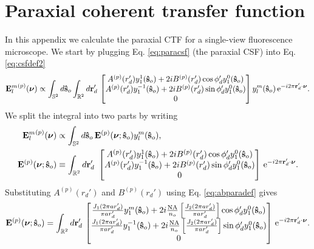 \documentclass[11pt]{article}
\newcommand{\me}{\mathrm{e}}
\providecommand{\mb}[1]{\mathbf{#1}}
\providecommand{\so}[1]{\mathbf{\hat{s}}_o}
\providecommand{\rd}[1]{\mathbf{r}_d}
\providecommand{\bs}[1]{\boldsymbol{#1}}
\begin{document}
\section{Paraxial coherent transfer function}\label{paraxialctf}
In this appendix we calculate the paraxial CTF for a single-view fluorescence
microscope. We start by plugging Eq. \ref{eq:paracsf} (the paraxial CSF) into Eq.
\ref{eq:csfdef2}
\begin{align}
  {\mb{E}_l^m}^{(p)}(\bs{\nu}) \propto \int_{\mathbb{S}^2}d\so{}\int_{\mathbb{R}^2}d\rd{}'\,
\begin{bmatrix}
    A^{(p)}(r_d')y_1^{1}(\so{}) + 2iB^{(p)}(r_d')\cos\phi_d'y_1^{0}(\so{})\\
    A^{(p)}(r_d')y_1^{-1}(\so{}) + 2iB^{(p)}(r_d')\sin\phi_d'y_1^{0}(\so{})\\
    0\\
  \end{bmatrix}
  y_l^m(\so{})\thinspace\me^{-i 2\pi\rd{}'\cdot\bs{\nu}}. 
\end{align}
We split the integral into two parts by writing
\begin{align}
  {\mb{E}_l^m}^{(p)}(\bs{\nu}) &\propto \int_{\mathbb{S}^2}d\so{}\, \mb{E}^{(p)}(\bs{\nu};\so{}) y_l^m(\so{}),\\ \label{eq:splitup}
  \mb{E}^{(p)}(\bs{\nu};\so{}) &\equiv  \int_{\mathbb{R}^2}d\rd{}'\
\begin{bmatrix}
    A^{(p)}(r_d')y_1^{1}(\so{}) + 2iB^{(p)}(r_d')\cos\phi_d'y_1^{0}(\so{})\\
    A^{(p)}(r_d')y_1^{-1}(\so{}) + 2iB^{(p)}(r_d')\sin\phi_d'y_1^{0}(\so{})\\
    0\\
  \end{bmatrix}
  \thinspace\me^{-i 2\pi\rd{}'\cdot\bs{\nu}}. 
\end{align}
Substituting $A^{(p)}(r_d')$ and $B^{(p)}(r_d')$ using Eq. \ref{eq:abparadef} gives
\begin{align}
  \mb{E}^{(p)}(\bs{\nu}; \so{}) = \int_{\mathbb{R}^2}d\rd{}'\,
\begin{bmatrix}
    \frac{J_1(2\pi ar_d')}{\pi ar_d'}y_1^m(\so{}) + 2i\frac{\text{NA}}{n_o}\left[\frac{J_2(2\pi ar_d')}{\pi ar_d'}\right]\cos\phi_d'y_1^0(\so{})\\
    \frac{J_1(2\pi ar_d')}{\pi ar_d'}y_1^{-1}(\so{}) + 2i\frac{\text{NA}}{n_o}\left[\frac{J_2(2\pi ar_d')}{\pi ar_d'}\right]\sin\phi_d'y_1^0(\so{})\\
    0\\
  \end{bmatrix}
  \thinspace\me^{-i 2\pi\rd{}'\cdot\bs{\nu}}.
\end{align}
\end{document}
